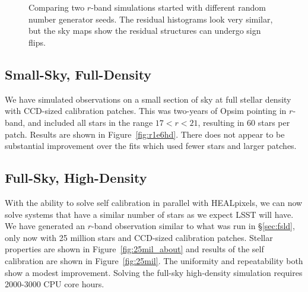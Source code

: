 \documentclass[12pt,preprint]{aastex}
\begin{document}
\begin{figure}
 \\
 \\
\caption{Comparing two $r$-band simulations started with different random number generator seeds.  The residual histograms look very similar, but the sky maps show the residual structures can undergo sign flips. \label{fig:diffseed} }
\end{figure}


\subsection{Small-Sky, Full-Density}
We have simulated observations on a small section of sky at full stellar density with CCD-sized calibration patches.  This was two-years of Opsim pointing in $r$-band, and included all stars in the range $17 < r < 21 $, resulting in 60 stars per patch.  Results are shown in Figure~\ref{fig:r1e6hd}.  There does not appear to be substantial improvement over the fits which used fewer stars and larger patches.


\subsection{Full-Sky, High-Density}

With the ability to solve self calibration in parallel with HEALpixels, we can now solve systems that have a similar number of stars as we expect LSST will have.  We have generated an $r$-band observation similar to what was run in \S\ref{sec:fsld}, only now with 25 million stars and CCD-sized calibration patches.  Stellar properties are shown in Figure~\ref{fig:25mil_about} and results of the self calibration are shown in Figure~\ref{fig:25mil}.  The uniformity and repeatability both show a modest improvement.  Solving the full-sky high-density simulation requires 2000-3000 CPU core hours.  
\end{document}
